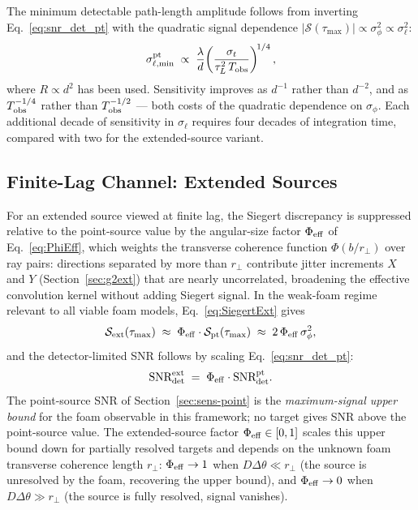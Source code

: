 \documentclass[aps,prd,onecolumn,amsmath,amssymb]{revtex4-2}
\begin{document}
The minimum detectable path-length amplitude follows from inverting
Eq.~\eqref{eq:snr_det_pt} with the quadratic signal dependence
$|\mathcal{S}(\tau_{\max})|\propto\sigma_\phi^2\propto\sigma_\ell^2$:
\begin{equation}
\sigma_{\ell,\rm min}^{\rm pt} \;\propto\;
\frac{\lambda}{d}\!\left(\frac{\sigma_t}{\tau_L^2\, T_{\rm obs}}\right)^{\!1/4},
\label{eq:sigma_ell_min_pt}
\end{equation}
where $R\propto d^2$ has been used. Sensitivity improves as $d^{-1}$ rather than
$d^{-2}$, and as $T_{\rm obs}^{-1/4}$ rather than
$T_{\rm obs}^{-1/2}$ --- both costs of the quadratic dependence on
$\sigma_\phi$. Each additional decade of sensitivity in $\sigma_\ell$ requires
four decades of integration time, compared with two for the extended-source
variant.

\subsection{Finite-Lag Channel: Extended Sources}
\label{sec:sens-extended}

For an extended source viewed at finite lag, the Siegert discrepancy is
suppressed relative to the point-source value by the angular-size factor
$\Phi_{\rm eff}$ of Eq.~\eqref{eq:PhiEff}, which weights the transverse
coherence function $\Phi(b/r_\perp)$ over ray pairs: directions separated
by more than $r_\perp$ contribute jitter increments $X$ and $Y$
(Section~\ref{sec:g2ext}) that are nearly uncorrelated, broadening the
effective convolution kernel without adding Siegert signal.
In the weak-foam regime relevant to all viable foam models,
Eq.~\eqref{eq:SiegertExt} gives
\begin{equation}
  \mathcal{S}_{\rm ext}(\tau_{\max})
  \;\approx\; \Phi_{\rm eff}\cdot\mathcal{S}_{\rm pt}(\tau_{\max})
  \;\approx\; 2\,\Phi_{\rm eff}\,\sigma_\phi^2,
  \label{eq:SiegertExtPeak}
\end{equation}
and the detector-limited SNR follows by scaling Eq.~\eqref{eq:snr_det_pt}:
\begin{equation}
  \textrm{SNR}_{\rm det}^{\rm ext}
  \;=\; \Phi_{\rm eff}\cdot\textrm{SNR}_{\rm det}^{\rm pt}.
  \label{eq:snr_det_ext}
\end{equation}
The point-source SNR of Section~\ref{sec:sens-point} is the
\emph{maximum-signal upper bound} for the foam observable in this
framework; no target gives SNR above the point-source value.  The
extended-source factor $\Phi_{\rm eff}\in[0,1]$ scales this upper bound
down for partially resolved targets and depends on the unknown foam
transverse coherence length $r_\perp$:
$\Phi_{\rm eff}\to 1$ when $D\Delta\theta \ll r_\perp$ (the source is
unresolved by the foam, recovering the upper bound), and
$\Phi_{\rm eff}\to 0$ when $D\Delta\theta \gg r_\perp$ (the source is
fully resolved, signal vanishes).
\end{document}
